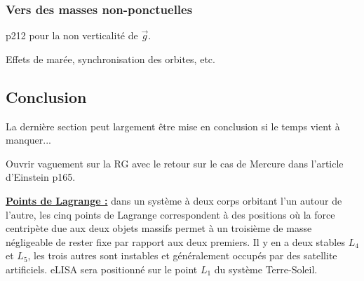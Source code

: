 \subsubsection{Vers des masses non-ponctuelles}

\cite{Sanz2016} p212 pour la non verticalité de $\overrightarrow{g}$.

Effets de marée, synchronisation des orbites, etc.

\subsection*{Conclusion}

La dernière section peut largement être mise en conclusion si le temps vient à manquer...

Ouvrir vaguement sur la RG avec le retour sur le cas de Mercure dans l'article d'Einstein \cite{Faroux1996} p165.

\begin{remarque}
\href{https://fr.wikipedia.org/wiki/Point_de_Lagrange}{\textbf{Points de Lagrange :}} dans un système à deux corps orbitant l'un autour de l'autre, les cinq points de Lagrange correspondent à des positions où la force centripète due aux deux objets massifs permet à un troisième de masse négligeable de rester fixe par rapport aux deux premiers.
Il y en a deux stables $L_4$ et $L_5$, les trois autres sont instables et généralement occupés par des satellite artificiels.
eLISA sera positionné sur le point $L_1$ du système Terre-Soleil.
\end{remarque}

\newpage